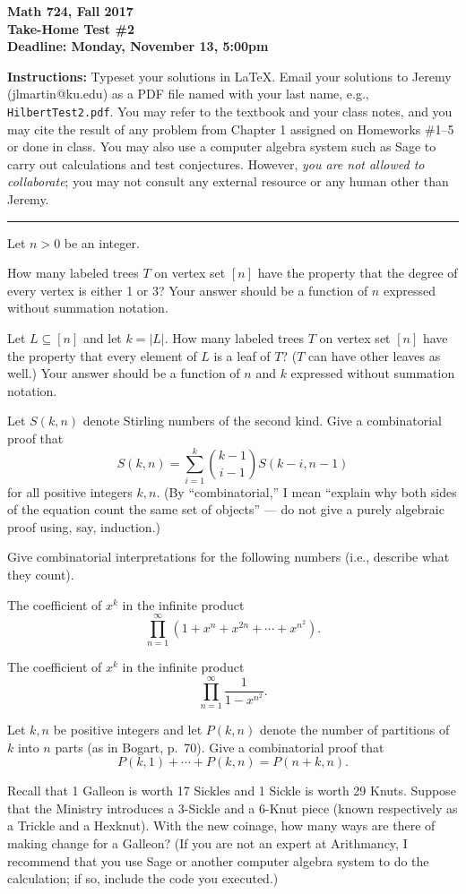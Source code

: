 

\thispagestyle{empty}

\textbf{Math 724, Fall 2017\\
Take-Home Test \#2\\
Deadline: Monday, November 13, 5:00pm}

\textbf{Instructions:} Typeset your solutions in LaTeX.  Email your solutions to Jeremy (jlmartin@ku.edu) as a PDF file named with your last name, e.g., {\tt HilbertTest2.pdf}.  You may refer to the textbook and your class notes, and you may cite the result of any problem from Chapter 1 assigned on Homeworks \#1--5 or done in class.  You may also use a computer algebra system such as Sage to carry out calculations and test conjectures.  However, \emph{you are not allowed to collaborate}; you may not consult any external resource or any human other than Jeremy.
\medskip\hrule

\prob
Let $n>0$ be an integer.

How many labeled trees $T$ on vertex set $[n]$ have the property that the degree of every vertex is either 1 or 3?
Your answer should be a function of $n$ expressed without summation notation.

Let $L\subseteq[n]$ and let $k=|L|$.  How many labeled trees $T$ on vertex set $[n]$ have the property that every element of $L$ is a leaf of $T$?  ($T$ can have other leaves as well.)  Your answer should be a function of $n$ and $k$ expressed without summation notation.

\vfill{}
Let $S(k,n)$ denote Stirling numbers of the second kind.  Give a combinatorial proof that
\[S(k,n) = \sum_{i=1}^k \binom{k-1}{i-1} S(k-i,n-1)\]
for all positive integers $k,n$.  (By ``combinatorial,'' I mean ``explain why both sides of the equation count the same set of objects'' --- do not give a purely algebraic proof using, say, induction.)

\vfill\prob
Give combinatorial interpretations for the following numbers (i.e., describe what they count).

 The coefficient of $x^k$ in the infinite product
\[\prod_{n=1}^\infty (1+x^n+x^{2n}+\cdots+x^{n^2}).\]

The coefficient of $x^k$ in the infinite product
\[\prod_{n=1}^\infty \frac{1}{1-x^{n^2}}.\]

 Let $k,n$ be positive integers and let $P(k,n)$ denote the number of partitions of $k$ into $n$ parts (as in Bogart, p.~70).  Give a combinatorial proof that
\[P(k,1)+\cdots+P(k,n)=P(n+k,n).\]

\vfill{}
Recall that 1 Galleon is worth 17 Sickles and 1 Sickle is worth 29 Knuts.  Suppose that the Ministry introduces
a 3-Sickle and a 6-Knut piece (known respectively as a Trickle and a Hexknut).  With the new coinage,
how many ways are there of making change for a Galleon?  (If you are not an expert at Arithmancy, I recommend that you use Sage or another
computer algebra system to do the calculation; if so, include the code you executed.)


